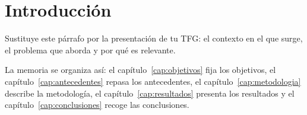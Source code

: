 \chapter{Introducción}\label{cap:introduccion}

Sustituye este párrafo por la presentación de tu \ac{TFG}: el contexto en el
que surge, el problema que aborda y por qué es relevante.

La memoria se organiza así: el capítulo~\ref{cap:objetivos} fija los objetivos,
el capítulo~\ref{cap:antecedentes} repasa los antecedentes, el
capítulo~\ref{cap:metodologia} describe la metodología, el
capítulo~\ref{cap:resultados} presenta los resultados y el
capítulo~\ref{cap:conclusiones} recoge las conclusiones.
